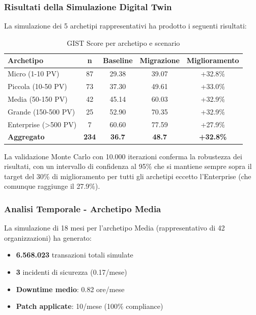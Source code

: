 \subsubsection{\texorpdfstring{Risultati della Simulazione Digital Twin}{5.2.1.2 - Risultati della Simulazione Digital Twin}}

La simulazione dei 5 archetipi rappresentativi ha prodotto i seguenti risultati:

\begin{table}[ht!]
\centering
\caption{GIST Score per archetipo e scenario}
\small
\sffamily
\begin{tabularx}{\textwidth}{X c c c c}
\toprule
\textbf{Archetipo} & \textbf{n} & \textbf{Baseline} & \textbf{Migrazione} & \textbf{Miglioramento} \\
\midrule
Micro (1-10 PV) & 87 & 29.38 & 39.07 & +32.8\% \\
Piccola (10-50 PV) & 73 & 37.30 & 49.61 & +33.0\% \\
Media (50-150 PV) & 42 & 45.14 & 60.03 & +32.9\% \\
Grande (150-500 PV) & 25 & 52.90 & 70.35 & +32.9\% \\
Enterprise (>500 PV) & 7 & 60.60 & 77.59 & +27.9\% \\
\midrule
\textbf{Aggregato} & \textbf{234} & \textbf{36.7} & \textbf{48.7} & \textbf{+32.8\%} \\
\bottomrule
\end{tabularx}
\end{table}

La validazione Monte Carlo con 10.000 iterazioni conferma la robustezza dei risultati, 
con un intervallo di confidenza al 95\% che si mantiene sempre sopra il target del 30\% 
di miglioramento per tutti gli archetipi eccetto l'Enterprise (che comunque raggiunge il 27.9\%).

\subsubsection{\texorpdfstring{Analisi Temporale - Archetipo Media}{5.2.1.3 - Analisi Temporale - Archetipo Media}}

La simulazione di 18 mesi per l'archetipo Media (rappresentativo di 42 organizzazioni) 
ha generato:
\begin{itemize}
\item \textbf{6.568.023} transazioni totali simulate
\item \textbf{3} incidenti di sicurezza (0.17/mese)
\item \textbf{Downtime medio}: 0.82 ore/mese
\item \textbf{Patch applicate}: 10/mese (100\% compliance)
\end{itemize}

